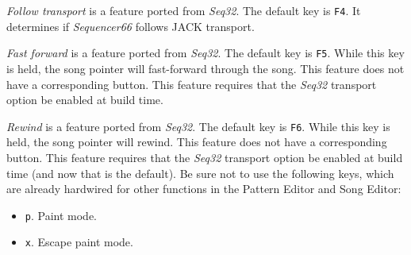 %
%

   \textsl{Follow transport} is a feature ported from \textsl{Seq32}.
   The default key is \texttt{F4}.
   It determines if \textsl{Sequencer66} follows JACK transport.

   \textsl{Fast forward} is a feature ported from \textsl{Seq32}.
   The default key is \texttt{F5}.
   While this key is held, the song pointer will fast-forward
   through the song.
   This feature does not have a corresponding button.
   This feature requires that the \textsl{Seq32} transport option be
   enabled at build time.

   \textsl{Rewind} is a feature ported from \textsl{Seq32}.
   The default key is \texttt{F6}.
   While this key is held, the song pointer will rewind.
   This feature does not have a corresponding button.
   This feature requires that the \textsl{Seq32} transport option be
   enabled at build time (and now that is the default).
   Be sure not to use the following keys, which are already
   hardwired for other functions in the Pattern Editor and Song Editor:

   \begin{itemize}
      \item \texttt{p}.  Paint mode.
      \item \texttt{x}.  Escape paint mode.
   \end{itemize}

